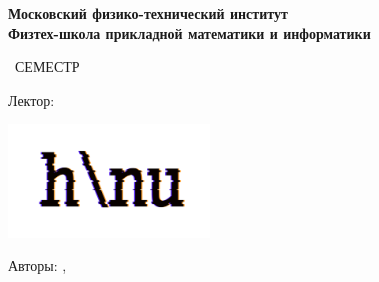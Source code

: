 \begin{titlepage}
	\clearpage\thispagestyle{empty}
	\centering
	
	\textbf{Московский физико-технический институт \\ Физтех-школа прикладной математики и информатики}
	\vspace{33ex}
	
	{\textbf{\FullCourseNameFirstPart}}
	
	\SemesterNumber\ СЕМЕСТР  
	\vspace{1ex}
	
	Лектор: \textit{\LecturerInitials}
	
	\includegraphics[width=0.4\textwidth]{logo_ltc.png}
	
	\begin{flushright}
		\noindent
		Авторы: \href{\FirstAuthorTGLink}{\textit{\FirstAuthorInitials}},\\
						\href{\SecondAuthorTGLink}{\textit{\SecondAuthorInitials}}
	\end{flushright}

	\vfill
	\CourseDate
	\pagebreak
\end{titlepage}
